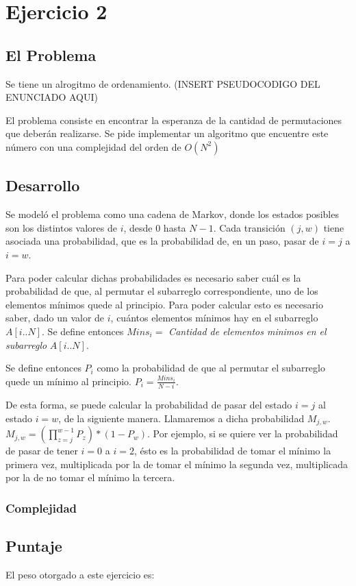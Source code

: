\section{Ejercicio 2}
\subsection{El Problema}

Se tiene un alrogitmo de ordenamiento. (INSERT PSEUDOCODIGO DEL ENUNCIADO AQUI)

El problema consiste en encontrar la esperanza de la cantidad de permutaciones que deberán realizarse. Se pide implementar un algoritmo que encuentre este número con una complejidad del orden de $O(N^2)$

\subsection{Desarrollo}

Se modeló el problema como una cadena de Markov, donde los estados posibles son los distintos valores de $i$, desde 0 hasta $N-1$. Cada transición $(j,w)$ tiene asociada una probabilidad, que es la probabilidad de, en un paso, pasar de $i=j$ a $i=w$.

Para poder calcular dichas probabilidades es necesario saber cuál es la probabilidad de que, al permutar el subarreglo correspondiente, uno de los elementos mínimos quede al principio. Para poder calcular esto es necesario saber, dado un valor de $i$, cuántos elementos mínimos hay en el subarreglo $A[i..N]$. Se define entonces $Mins_i =$ \emph{Cantidad de elementos minimos en el subarreglo} $A[i..N]$.

Se define entonces $P_i$ como la probabilidad de que al permutar el subarreglo quede un mínimo al principio.
$P_i = \frac{Mins_i}{N-i}$.

De esta forma, se puede calcular la probabilidad de pasar del estado $i=j$ al estado $i=w$, de la siguiente manera. Llamaremos a dicha probabilidad $M_{j,w}$. $M_{j,w} = (\prod_{z=j}^{w-1} P_z) * (1 - P_w)$. Por ejemplo, si se quiere ver la probabilidad de pasar de tener $i=0$ a $i=2$, ésto es la probabilidad de tomar el mínimo la primera vez, multiplicada por la de tomar el mínimo la segunda vez, multiplicada por la de no tomar el mínimo la tercera.


\subsubsection{Complejidad}

\subsection{Puntaje}
El peso otorgado a este ejercicio es:
